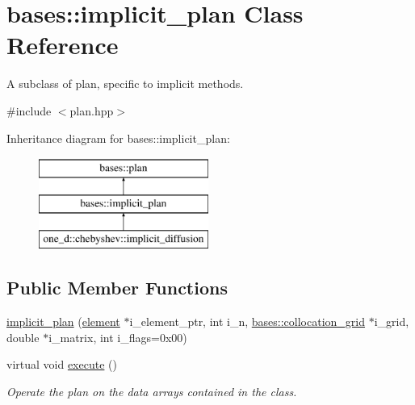 \hypertarget{classbases_1_1implicit__plan}{\section{bases\-:\-:implicit\-\_\-plan Class Reference}
\label{classbases_1_1implicit__plan}
}


A subclass of plan, specific to implicit methods.  




{\ttfamily \#include $<$plan.\-hpp$>$}

Inheritance diagram for bases\-:\-:implicit\-\_\-plan\-:\begin{figure}[H]
\begin{center}
\leavevmode
\includegraphics[height=3.000000cm]{classbases_1_1implicit__plan}
\end{center}
\end{figure}
\subsection*{Public Member Functions}
\begin{DoxyCompactItemize}
\item 
\hyperlink{classbases_1_1implicit__plan_aee12711a50c3fdec6da0861fba6736f1}{implicit\-\_\-plan} (\hyperlink{classbases_1_1element}{element} $\ast$i\-\_\-element\-\_\-ptr, int i\-\_\-n, \hyperlink{classbases_1_1collocation__grid}{bases\-::collocation\-\_\-grid} $\ast$i\-\_\-grid, double $\ast$i\-\_\-matrix, int i\-\_\-flags=0x00)
\begin{DoxyCompactList}\small\item\em \end{DoxyCompactList}\item 
virtual void \hyperlink{classbases_1_1implicit__plan_a564bcb2be88ca9abe77c981d77d58d74}{execute} ()
\begin{DoxyCompactList}\small\item\em Operate the plan on the data arrays contained in the class. \end{DoxyCompactList}\end{DoxyCompactItemize}
